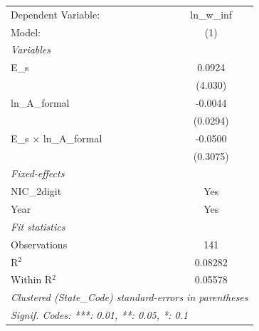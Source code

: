 
\begingroup
\centering
\begin{tabular}{lc}
   \tabularnewline \midrule \midrule
   Dependent Variable:             & ln\_w\_inf\\    
   Model:                          & (1)\\  
   \midrule
   \emph{Variables}\\
   E\_s                            & 0.0924\\   
                                   & (4.030)\\   
   ln\_A\_formal                   & -0.0044\\   
                                   & (0.0294)\\   
   E\_s $\times$ ln\_A\_formal     & -0.0500\\   
                                   & (0.3075)\\   
   \midrule
   \emph{Fixed-effects}\\
   NIC\_2digit                     & Yes\\  
   Year                            & Yes\\  
   \midrule
   \emph{Fit statistics}\\
   Observations                    & 141\\  
   R$^2$                           & 0.08282\\  
   Within R$^2$                    & 0.05578\\  
   \midrule \midrule
   \multicolumn{2}{l}{\emph{Clustered (State\_Code) standard-errors in parentheses}}\\
   \multicolumn{2}{l}{\emph{Signif. Codes: ***: 0.01, **: 0.05, *: 0.1}}\\
\end{tabular}
\par\endgroup


